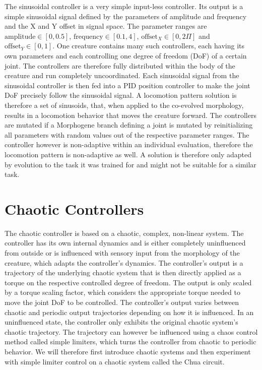 \documentclass[main]{subfiles}
\begin{document}
The sinusoidal controller is a very simple input-less controller. %
%
Its output is a simple sinusoidal signal defined by the parameters of amplitude and frequency and the X and Y offset in signal space. %
%
The parameter ranges are $\text{amplitude} \in [0,0.5]$, $\text{frequency} \in [0.1,4]$, $\text{offset}_X \in [0,2\Pi]$ and $\text{offset}_Y \in [0,1]$. %
%
One creature contains many such controllers, each having its own parameters and each controlling one degree of freedom (DoF) of a certain joint. %
%
The controllers are therefore fully distributed within the body of the creature and run completely uncoordinated. %
%
Each sinusoidal signal from the sinusoidal controller is then fed into a PID position controller to make the joint DoF precisely follow the sinusoidal signal. %
%
A locomotion pattern solution is therefore a set of sinusoids, that, when applied to the co-evolved morphology, results in a locomotion behavior that moves the creature forward. %
%
The controllers are mutated if a Morphogene branch defining a joint is mutated by reinitializing all parameters with random values out of the respective parameter ranges. %
%
The controller however is non-adaptive within an individual evaluation, therefore the locomotion pattern is non-adaptive as well. %
%
A solution is therefore only adapted by evolution to the task it was trained for and might not be suitable for a similar task.

\section{Chaotic Controllers}
\label{sec:chaotic-controllers}

The chaotic controller is based on a chaotic, complex, non-linear system. %
%
The controller has its own internal dynamics and is either completely uninfluenced from outside or is influenced with sensory input from the morphology of the creature, which adapts the controller's dynamics. %
%
The controller's output is a trajectory of the underlying chaotic system that is then directly applied as a torque on the respective controlled degree of freedom. %
%
The output is only scaled by a torque scaling factor, which considers the appropriate torque needed to move the joint DoF to be controlled. %
%
The controller's output varies between chaotic and periodic output trajectories depending on how it is influenced. %
%
In an uninfluenced state, the controller only exhibits the original chaotic system's chaotic trajectory. %
%
The trajectory can however be influenced using a chaos control method called simple limiters, which turns the controller from chaotic to periodic behavior. %
%
We will therefore first introduce chaotic systems and then experiment with simple limiter control on a chaotic system called the Chua circuit.
\end{document}
